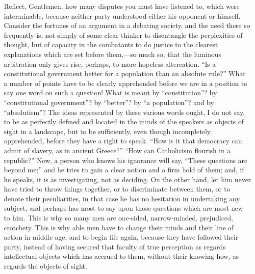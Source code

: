 Reflect, Gentlemen, how many disputes you must have listened to,
which were interminable, because neither party understood either his
opponent or himself. Consider the fortunes of an argument in a
debating society, and the need there so frequently is, not simply of
some clear thinker to disentangle the perplexities of thought, but of
capacity in the combatants to do justice to the clearest explanations
which are set before them,—so much so, that the luminous arbitration
only gives rise, perhaps, to more hopeless altercation. ``Is a
constitutional government better for a population than an absolute
rule?'' What a number of points have to be clearly apprehended
before we are in a position to say one word on such a question! What
is meant by ``constitution''? by ``constitutional
government''? by ``better''? by ``a population''?
and by ``absolutism''? The ideas represented by these
various words ought, I do not say, to be as perfectly defined and
located in the minds of the speakers as objects of sight in a
landscape, but to be sufficiently, even though incompletely,
apprehended, before they have a right to speak. ``How is it that
democracy can admit of slavery, as in ancient Greece?'' ``How
can Catholicism flourish in a republic?'' Now, a person who knows
his ignorance will say, ``These questions are beyond me;'' and
he tries to gain a clear notion and a firm hold of them; and, if he
speaks, it is as investigating, not as deciding. On the other hand,
let him never have tried to throw things together, or to discriminate
between them, or to denote their peculiarities, in that case he has no
hesitation in undertaking any subject, and perhaps has most to say
upon those questions which are most new to him. This is why so many
men are one-sided, narrow-minded, prejudiced, crotchety. This is why
able men have to change their minds and their line of action in middle
age, and to begin life again, because they have followed their party,
instead of having secured that faculty of true perception as regards
intellectual objects which has accrued to them, without their knowing
how, as regards the objects of sight.


